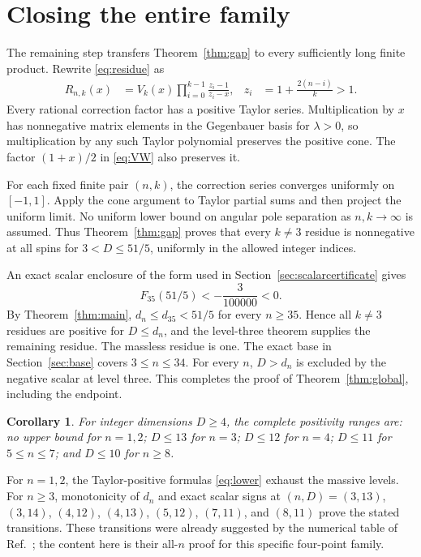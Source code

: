 \documentclass[11pt,a4paper]{article}
\newtheorem{corollary}[theorem]{Corollary}
\theoremstyle{remark}\newtheorem{remark}[theorem]{Remark}
\begin{document}
\section{Closing the entire family}\label{sec:globalclosure}
The remaining step transfers Theorem~\ref{thm:gap} to every sufficiently long finite product. Rewrite \eqref{eq:residue} as
\begin{align}\label{eq:correction}
 R_{n,k}(x)&=V_k(x)\prod_{i=0}^{k-1}
              \frac{z_i-1}{z_i-x},
 &z_i&=1+\frac{2(n-i)}{k}>1.
\end{align}
Every rational correction factor has a positive Taylor series. Multiplication by $x$ has nonnegative matrix elements in the Gegenbauer basis for $\lambda>0$, so multiplication by any such Taylor polynomial preserves the positive cone. The factor $(1+x)/2$ in \eqref{eq:VW} also preserves it.

For each fixed finite pair $(n,k)$, the correction series converges uniformly on $[-1,1]$. Apply the cone argument to Taylor partial sums and then project the uniform limit. No uniform lower bound on angular pole separation as $n,k\to\infty$ is assumed. Thus Theorem~\ref{thm:gap} proves that every $k\neq3$ residue is nonnegative at all spins for $3<D\leq51/5$, uniformly in the allowed integer indices.

An exact scalar enclosure of the form used in Section~\ref{sec:scalarcertificate} gives
\begin{equation}\label{eq:cutoff35}
 F_{35}(51/5)<-\frac3{100000}<0.
\end{equation}
By Theorem~\ref{thm:main}, $d_n\leq d_{35}<51/5$ for every $n\geq35$. Hence all $k\neq3$ residues are positive for $D\leq d_n$, and the level-three theorem supplies the remaining residue. The massless residue is one. The exact base in Section~\ref{sec:base} covers $3\leq n\leq34$. For every $n$, $D>d_n$ is excluded by the negative scalar at level three. This completes the proof of Theorem~\ref{thm:global}, including the endpoint.

\begin{corollary}\label{cor:integer}
For integer dimensions $D\geq4$, the complete positivity ranges are: no upper bound for $n=1,2$; $D\leq13$ for $n=3$; $D\leq12$ for $n=4$; $D\leq11$ for $5\leq n\leq7$; and $D\leq10$ for $n\geq8$.
\end{corollary}
For $n=1,2$, the Taylor-positive formulas \eqref{eq:lower} exhaust the massive levels. For $n\geq3$, monotonicity of $d_n$ and exact scalar signs at $(n,D)=(3,13)$, $(3,14)$, $(4,12)$, $(4,13)$, $(5,12)$, $(7,11)$, and $(8,11)$ prove the stated transitions. These transitions were already suggested by the numerical table of Ref.~\cite{Shao}; the content here is their all-$n$ proof for this specific four-point family.
\end{document}
